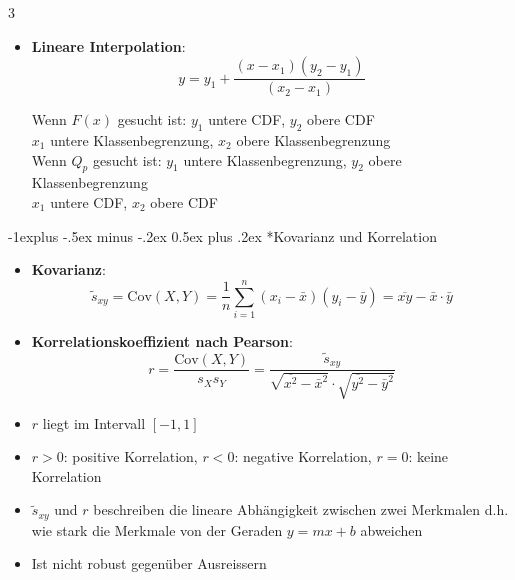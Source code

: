 \documentclass[10pt,a4paper,landscape]{article}
\makeatletter
\renewcommand{\subsection}{\@startsection{subsection}{2}{0mm}%
                                {-1explus -.5ex minus -.2ex}%
                                {0.5ex plus .2ex}%
                                {\normalfont\normalsize\bfseries}}
\makeatother
\begin{document}
\begin{multicols*}{3}
{\begin{itemize}
					 \item \textbf{Lineare Interpolation}:
					       \begin{equation*}
						       y = y_1 + \frac{(x - x_1)(y_2 - y_1)}{(x_2 - x_1)}
					       \end{equation*}
					       \begin{center}
						       Wenn $F(x)$ gesucht ist: $y_1$ untere CDF, $y_2$ obere CDF \\
						       $x_1$ untere Klassenbegrenzung, $x_2$ obere Klassenbegrenzung \\
						       Wenn $Q_p$ gesucht ist: $y_1$ untere Klassenbegrenzung, $y_2$ obere Klassenbegrenzung \\
						       $x_1$ untere CDF, $x_2$ obere CDF
					       \end{center}
				 \end{itemize}
			 }

		 \subsection*{Kovarianz und Korrelation}
			 \begin{itemize}
				 \item \textbf{Kovarianz}:
				       \begin{equation*}
					       \tilde{s}_{xy} = \text{Cov}(X,Y) = \frac{1}{n} \sum_{i=1}^{n} (x_i - \bar{x})(y_i - \bar{y}) = \overline{xy} - \bar{x} \cdot \bar{y}
				       \end{equation*}
				 \item \textbf{Korrelationskoeffizient nach Pearson}:
				       \begin{equation*}
					       r = \frac{\text{Cov}(X,Y)}{s_X s_Y} = \frac{\tilde{s}_{xy}}{\sqrt{\overline{x^2} - \bar{x}^2} \cdot \sqrt{\overline{y^2} - \bar{y}^2}}
				       \end{equation*}
				 \item $r$ liegt im Intervall $[-1, 1]$
				 \item $r > 0$: positive Korrelation, $r < 0$: negative Korrelation, $r = 0$: keine Korrelation
				 \item $\tilde{s}_{xy}$ und $r$ beschreiben die lineare Abhängigkeit zwischen zwei Merkmalen d.h. wie stark die Merkmale von der Geraden $y = mx + b$ abweichen
				 \item Ist nicht robust gegenüber Ausreissern
			 \end{itemize}


\end{multicols*}
\end{document}
